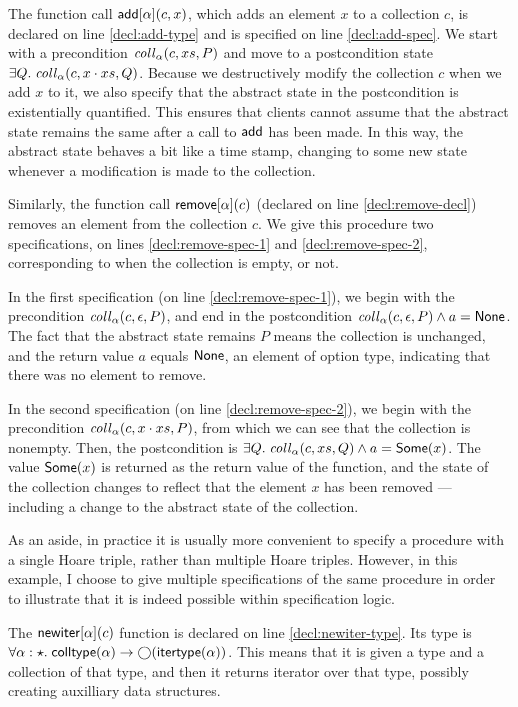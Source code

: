The function call $\mathsf{add}[\alpha](c, x)$, which adds an element $x$
to a collection $c$, is declared on line \ref{decl:add-type} and is
specified on line \ref{decl:add-spec}. We start with a precondition
$\mathit{coll}_\alpha(c, xs, P)$ and move to a postcondition state
$\exists Q.\; \mathit{coll}_\alpha(c, x\cdot xs, Q)$. Because we
destructively modify the collection $c$ when we add $x$ to it, we also
specify that the abstract state in the postcondition is existentially
quantified. This ensures that clients cannot assume that the abstract
state remains the same after a call to $\mathsf{add}$ has been made. In
this way, the abstract state behaves a bit like a time stamp, changing
to some new state whenever a modification is made to the collection. 

Similarly, the function call $\mathsf{remove}[\alpha](c)$ (declared on
line \ref{decl:remove-decl}) removes an element from the collection
$c$. We give this procedure two specifications, on lines
\ref{decl:remove-spec-1} and \ref{decl:remove-spec-2}, corresponding
to when the collection is empty, or not. 

In the first specification (on line \ref{decl:remove-spec-1}), we
begin with the precondition $\mathit{coll}_\alpha(c, \epsilon, P)$, and
end in the postcondition $\mathit{coll}_\alpha(c, \epsilon, P) \land a =
\mathsf{None}$. The fact that the abstract state remains $P$ means the
collection is unchanged, and the return value $a$ equals $\mathsf{None}$, 
an element of option type, indicating that there was no element to remove.

In the second specification (on line \ref{decl:remove-spec-2}), we
begin with the precondition $\mathit{coll}_\alpha(c, x\cdot xs, P)$, from
which we can see that the collection is nonempty. Then, the postcondition
is $\exists Q.\; \mathit{coll}_\alpha(c, xs, Q) \land a = \mathsf{Some}(x)$. 
The value $\mathsf{Some}(x)$ is returned as the return value of the function,
and the state of the collection changes to reflect that the element $x$
has been removed --- including a change to the abstract state of the 
collection. 

As an aside, in practice it is usually more convenient to specify a
procedure with a single Hoare triple, rather than multiple Hoare
triples. However, in this example, I choose to give multiple
specifications of the same procedure in order to illustrate that it is
indeed possible within specification logic.

The $\mathsf{newiter}[\alpha](c)$ function is declared on line
\ref{decl:newiter-type}.  Its type is $\forall \alpha:\star.\;
\mathsf{colltype}(\alpha) \to \bigcirc{(\mathsf{itertype}(\alpha))}$.  This means that
it is given a type and a collection of that type, and then it returns
iterator over that type, possibly creating auxilliary data structures.

